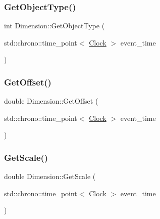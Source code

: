 \mbox{\label{classDimension_a72f494215a114cb43cecd9b170bcde51}} 
\subsubsection{\texorpdfstring{Get\+Object\+Type()}{GetObjectType()}}
{\footnotesize\ttfamily int Dimension\+::\+Get\+Object\+Type (\begin{DoxyParamCaption}\item[{std\+::chrono\+::time\+\_\+point$<$ \mbox{\hyperlink{universe_8h_a0ef8d951d1ca5ab3cfaf7ab4c7a6fd80}{Clock}} $>$}]{event\+\_\+time }\end{DoxyParamCaption})\hspace{0.3cm}{\ttfamily [inline]}}

\mbox{\label{classDimension_a58009cd435ead4b7b2f395a11fda0ae8}} 
\subsubsection{\texorpdfstring{Get\+Offset()}{GetOffset()}}
{\footnotesize\ttfamily double Dimension\+::\+Get\+Offset (\begin{DoxyParamCaption}\item[{std\+::chrono\+::time\+\_\+point$<$ \mbox{\hyperlink{universe_8h_a0ef8d951d1ca5ab3cfaf7ab4c7a6fd80}{Clock}} $>$}]{event\+\_\+time }\end{DoxyParamCaption})\hspace{0.3cm}{\ttfamily [inline]}}

\mbox{\label{classDimension_a6985e3d8738202530cb2cd428b5b884c}} 
\subsubsection{\texorpdfstring{Get\+Scale()}{GetScale()}}
{\footnotesize\ttfamily double Dimension\+::\+Get\+Scale (\begin{DoxyParamCaption}\item[{std\+::chrono\+::time\+\_\+point$<$ \mbox{\hyperlink{universe_8h_a0ef8d951d1ca5ab3cfaf7ab4c7a6fd80}{Clock}} $>$}]{event\+\_\+time }\end{DoxyParamCaption})\hspace{0.3cm}{\ttfamily [inline]}}

